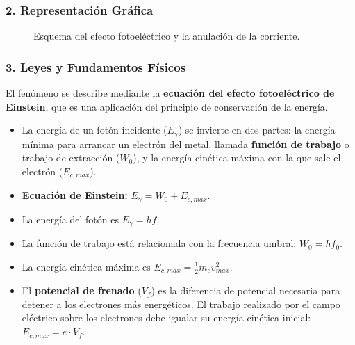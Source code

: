 \subsubsection*{2. Representación Gráfica}
\begin{figure}[H]
    \centering
    \caption{Esquema del efecto fotoeléctrico y la anulación de la corriente.}
\end{figure}

\subsubsection*{3. Leyes y Fundamentos Físicos}
El fenómeno se describe mediante la \textbf{ecuación del efecto fotoeléctrico de Einstein}, que es una aplicación del principio de conservación de la energía.
\begin{itemize}
    \item La energía de un fotón incidente ($E_{\gamma}$) se invierte en dos partes: la energía mínima para arrancar un electrón del metal, llamada \textbf{función de trabajo} o trabajo de extracción ($W_0$), y la energía cinética máxima con la que sale el electrón ($E_{c,max}$).
    \item \textbf{Ecuación de Einstein:} $E_{\gamma} = W_0 + E_{c,max}$.
    \item La energía del fotón es $E_{\gamma} = hf$.
    \item La función de trabajo está relacionada con la frecuencia umbral: $W_0 = hf_0$.
    \item La energía cinética máxima es $E_{c,max} = \frac{1}{2} m_e v_{max}^2$.
    \item El \textbf{potencial de frenado} ($V_f$) es la diferencia de potencial necesaria para detener a los electrones más energéticos. El trabajo realizado por el campo eléctrico sobre los electrones debe igualar su energía cinética inicial: $E_{c,max} = e \cdot V_f$.
\end{itemize}

